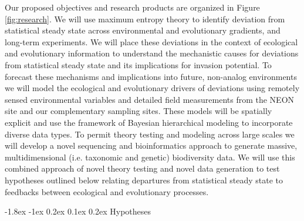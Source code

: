 \documentclass[11pt]{article}
\makeatletter
\renewcommand\subsubsection{\@startsection{subsection}{1}{\z@}%
                                  {-1.8ex \@plus -1ex \@minus 0.2ex}%
                                  {0.1ex \@plus 0.2ex}%
                                  {\normalfont\bfseries}}
\makeatother
\begin{document}
Our proposed objectives and research products are organized in Figure
\ref{fig:research}. We will use maximum entropy theory to identify
deviation from statistical steady state across environmental and
evolutionary gradients, and long-term experiments.  We will place
these deviations in the context of ecological and evolutionary
information to understand the mechanistic causes for deviations from
statistical steady state and its implications for invasion potential.
To forecast these mechanisms and implications into future, non-analog
environments we will model the ecological and evolutionary drivers of
deviations using remotely sensed environmental variables and detailed
field measurements from the NEON site and our complementary sampling
sites.  These models will be spatially explicit and use the framework
of Bayesian hierarchical modeling to incorporate diverse data types.
To permit theory testing and modeling across large scales we will
develop a novel sequencing and bioinformatics approach to generate
massive, multidimensional (i.e. taxonomic and genetic) biodiversity
data.  We will use this combined approach of novel theory testing and
novel data generation to test hypotheses outlined below relating
departures from statistical steady state to feedbacks between
ecological and evolutionary processes.

\subsubsection{Hypotheses}
\end{document}
